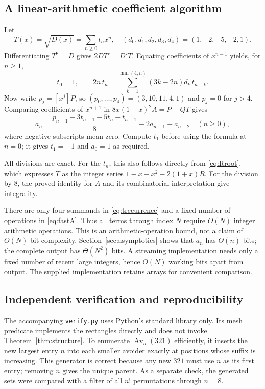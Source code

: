 \documentclass[11pt,a4paper]{article}
\theoremstyle{definition}
\theoremstyle{remark}
\newcommand{\Av}{\operatorname{Av}}
\begin{document}
\subsection{A linear-arithmetic coefficient algorithm}

Let
\[
 T(x)=\sqrt{D(x)}=\sum_{n\geq0}t_nx^n,
 \quad (d_0,d_1,d_2,d_3,d_4)=(1,-2,-5,-2,1).
\]
Differentiating $T^2=D$ gives $2DT'=D'T$. Equating coefficients of $x^{n-1}$
yields, for $n\geq1$,
\begin{equation}\label{eq:trecurrence}
 \boxed{\displaystyle
 t_0=1,\qquad
 2n\,t_n=\sum_{k=1}^{\min(4,n)}(3k-2n)d_k\,t_{n-k}.}
\end{equation}
Now write $p_j=[x^j]P$, so $(p_0,\ldots,p_4)=(3,10,11,4,1)$ and $p_j=0$
for $j>4$. Comparing coefficients of $x^{n+1}$ in
$8x(1+x)^2A=P-QT$ gives
\begin{equation}\label{eq:fastA}
 \boxed{\displaystyle
 a_n=\frac{p_{n+1}-3t_{n+1}-5t_n-t_{n-1}}8
          -2a_{n-1}-a_{n-2}\quad(n\geq0),}
\end{equation}
where negative subscripts mean zero. Compute $t_1$ before using the formula
at $n=0$; it gives $t_1=-1$ and $a_0=1$ as required.

All divisions are exact. For the $t_n$, this also follows directly from
\eqref{eq:Rroot}, which expresses $T$ as the integer series
$1-x-x^2-2(1+x)R$. For the division by $8$, the proved identity for $A$
and its combinatorial interpretation give integrality.

There are only four summands in \eqref{eq:trecurrence} and a fixed number
of operations in \eqref{eq:fastA}. Thus all terms through index $N$ require
$O(N)$ integer arithmetic operations. This is an arithmetic-operation
bound, not a claim of $O(N)$ bit complexity. Section~\ref{sec:asymptotics}
shows that $a_n$ has $\Theta(n)$ bits; the complete output has
$\Theta(N^2)$ bits. A streaming implementation needs only a fixed number
of recent large integers, hence $O(N)$ working bits apart from output.
The supplied implementation retains arrays for convenient comparison.

\subsection{Independent verification and reproducibility}

The accompanying \texttt{verify.py} uses Python's standard library only.
Its mesh predicate implements the rectangles directly and does not invoke
Theorem~\ref{thm:structure}. To enumerate $\Av_n(321)$ efficiently, it
inserts the new largest entry $n$ into each smaller avoider exactly at
positions whose suffix is increasing. This generator is correct because
any new $321$ must use $n$ as its first entry; removing $n$ gives the unique
parent. As a separate check, the generated sets were compared with a filter
of all $n!$ permutations through $n=8$.
\end{document}
